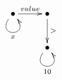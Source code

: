 $\xymatrix{
   \bullet \ar@(dl,dr)[]_{x} \ar[r]^{value} & \bullet \ar[d]^{>} \\
   & \bullet \ar@(dl,dr)[]_{10}
}$
